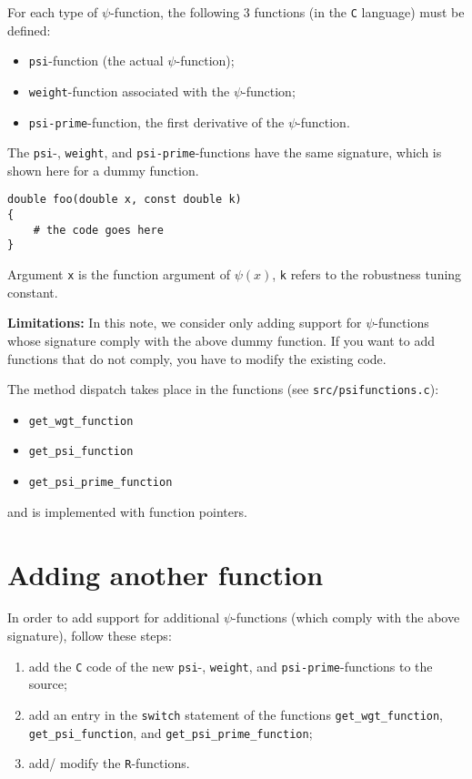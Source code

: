 \documentclass[a4paper,oneside,11pt,DIV=12]{scrartcl}
\newcommand{\code}[1]{{\texttt{#1}}}
\begin{document}
\noindent For each type of $\psi$-function, the following 3 functions (in
the \code{C} language) must be defined:
\begin{itemize}
    \item \code{psi}-function (the actual $\psi$-function);
    \item \code{weight}-function associated with the $\psi$-function;
    \item \code{psi-prime}-function, the first derivative of the
        $\psi$-function.
\end{itemize}

\noindent The \code{psi}-, \code{weight}, and \code{psi-prime}-functions
have the same signature, which is shown here for a dummy function.

\begin{verbatim}
double foo(double x, const double k)
{
    # the code goes here
}
\end{verbatim}

\noindent Argument \code{x} is the function argument of $\psi(x)$, \code{k}
refers to the robustness tuning constant.

\begin{leftbar}
\noindent \textbf{Limitations:} In this note, we consider only adding support
for $\psi$-functions whose signature comply with the above dummy function.
If you want to add functions that do not comply, you have to modify the
existing code.
\end{leftbar}

\noindent The method dispatch takes place in the functions (see
\code{src/psifunctions.c}):
\begin{itemize}
    \item \code{get\_wgt\_function}
    \item \code{get\_psi\_function}
    \item \code{get\_psi\_prime\_function}
\end{itemize}
\noindent and is implemented with function pointers.

\section{Adding another function}
In order to add support for additional $\psi$-functions (which comply with
the above signature), follow these steps:

\begin{enumerate}[1]
    \item add the \code{C} code of the new \code{psi}-, \code{weight}, and
        \code{psi-prime}-functions to the source;
    \item add an entry in the \code{switch} statement of the functions
    \code{get\_wgt\_function}, \code{get\_psi\_function}, and
    \code{get\_psi\_prime\_function};
    \item add/ modify the \code{R}-functions.
\end{enumerate}
\end{document}

